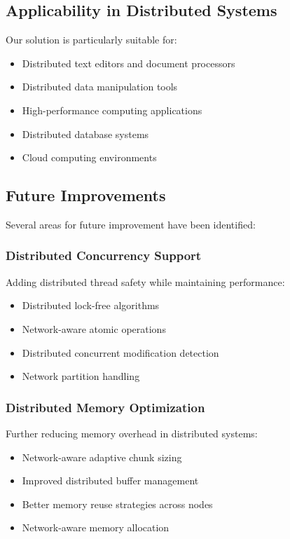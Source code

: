\subsection{Applicability in Distributed Systems}

Our solution is particularly suitable for:
\begin{itemize}
    \item Distributed text editors and document processors
    \item Distributed data manipulation tools
    \item High-performance computing applications
    \item Distributed database systems
    \item Cloud computing environments
\end{itemize}

\subsection{Future Improvements}

Several areas for future improvement have been identified:

\subsubsection{Distributed Concurrency Support}
Adding distributed thread safety while maintaining performance:
\begin{itemize}
    \item Distributed lock-free algorithms
    \item Network-aware atomic operations
    \item Distributed concurrent modification detection
    \item Network partition handling
\end{itemize}

\subsubsection{Distributed Memory Optimization}
Further reducing memory overhead in distributed systems:
\begin{itemize}
    \item Network-aware adaptive chunk sizing
    \item Improved distributed buffer management
    \item Better memory reuse strategies across nodes
    \item Network-aware memory allocation
\end{itemize}

